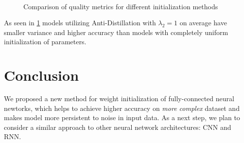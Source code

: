 \documentclass[80pt]{article}
\begin{document}
\begin{figure}[!t]
  \\
 \caption{Comparison of quality metrics for different initialization methods}
  \label{fig:2}
\end{figure}

As seen in \ref{fig:2} models utilizing Anti-Distillation with $\lambda_2 = 1$ on average have smaller variance and higher accuracy than models with completely uniform initialization of parameters.

\section{Conclusion}

We proposed a new method for weight initialization of fully-connected neural newtorks, which helps to achieve higher accuracy on \textit{more complex} dataset and makes model more persistent to noise in input data. As a next step, we plan to consider a similar approach to other neural network architectures: CNN and RNN.



\end{document}
